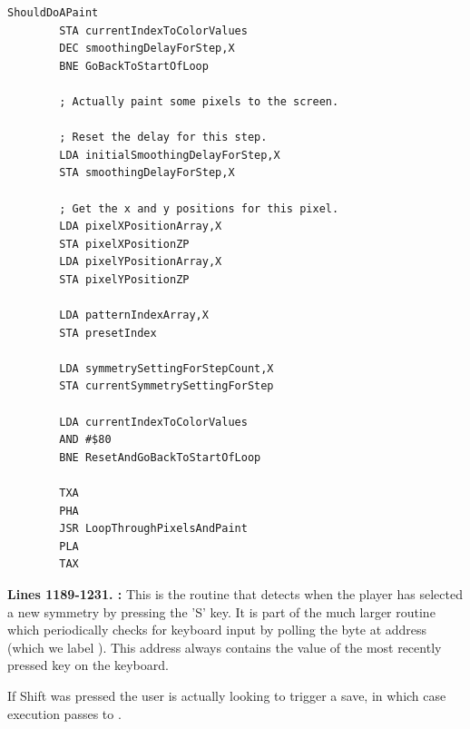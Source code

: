 \begin{lstlisting}[caption=From \icode{MainPaintLoop}.]
ShouldDoAPaint   
        STA currentIndexToColorValues
        DEC smoothingDelayForStep,X
        BNE GoBackToStartOfLoop

        ; Actually paint some pixels to the screen.

        ; Reset the delay for this step.
        LDA initialSmoothingDelayForStep,X
        STA smoothingDelayForStep,X

        ; Get the x and y positions for this pixel.
        LDA pixelXPositionArray,X
        STA pixelXPositionZP
        LDA pixelYPositionArray,X
        STA pixelYPositionZP

        LDA patternIndexArray,X
        STA presetIndex

        LDA symmetrySettingForStepCount,X
        STA currentSymmetrySettingForStep

        LDA currentIndexToColorValues
        AND #$80
        BNE ResetAndGoBackToStartOfLoop

        TXA 
        PHA 
        JSR LoopThroughPixelsAndPaint
        PLA 
        TAX 
\end{lstlisting}
\clearpage
\textbf{Lines 1189-1231. :} This is the routine that detects when the player has selected a new
symmetry by pressing the 'S' key. It is part of the much larger routine  which periodically checks
for keyboard input by polling the byte at address  (which we label ). This address always
contains the value of the most recently pressed key on the keyboard.

If Shift was pressed the user is actually looking to trigger a save, in which case execution passes to .
